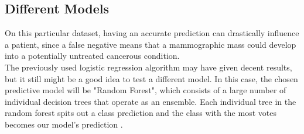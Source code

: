 \documentclass[a4paper,12pt]{article}\usepackage[]{graphicx}\usepackage[]{color}
\begin{document}
\clearpage

\subsection{Different Models}\label{different_models}
On this particular dataset, having an accurate prediction can drastically influence a patient, since a false negative means that a  mammographic mass could develop into a potentially untreated cancerous condition.\\
The previously used logistic regression algorithm may have given decent results, but it still might be a good idea to test a different model. In this case, the chosen predictive model will be "Random Forest", which consists of a large number of individual decision trees that operate as an ensemble. Each individual tree in the random forest spits out a class prediction and the class with the most votes becomes our model’s prediction \cite{yiu_2019}.
\end{document}
